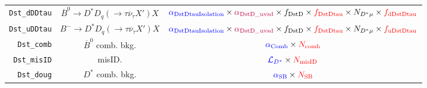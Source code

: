 \begin{landscape}
\begin{table}
\begin{tabular}{r|c|c}
  \texttt{Dst\_dDDtau} & $\overline{B}^0 \rightarrow D^* D_q (\rightarrow \tau \overline{\nu}_\tau X') X$  &                                                                             $\textcolor{blue}{\alpha_\text{DstDtauIsolation}} \times \textcolor{purple}{\alpha_\text{DstD\_uvsd}} \times f_\text{DstD} \times \textcolor{red}{f_\text{DstDtau}} \times N_{D^* \mu} \times \textcolor{red}{f_\text{dDstDtau}}$                                                                              \\
  \texttt{Dst\_uDDtau} &       $B^- \rightarrow D^* D_q (\rightarrow \tau \overline{\nu}_\tau X') X$       &                                                                             $\textcolor{blue}{\alpha_\text{DstDtauIsolation}} \times \textcolor{purple}{\alpha_\text{DstD\_uvsd}} \times f_\text{DstD} \times \textcolor{red}{f_\text{DstDtau}} \times N_{D^* \mu} \times \textcolor{red}{f_\text{uDstDtau}}$                                                                              \\
    \texttt{Dst\_comb} &                            $\overline{B}^0$ comb. bkg.                            &                                                                                                                                                        $\textcolor{blue}{\alpha_\text{Comb}} \times \textcolor{red}{N_\text{comb}}$                                                                                                                                                        \\
   \texttt{Dst\_misID} &                                      misID.                                       &                                                                                                                                                        $\textcolor{blue}{\mathcal{L}_{D^*}} \times \textcolor{red}{N_\text{misID}}$                                                                                                                                                        \\
    \texttt{Dst\_doug} &                                 $D^*$ comb. bkg.                                  &                                                                                                                                                          $\textcolor{blue}{\alpha_\text{SB}} \times \textcolor{red}{N_\text{SB}}$                                                                                                                                                          \\
\bottomrule
\end{tabular}

\end{table}
\end{landscape}
